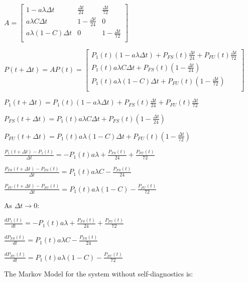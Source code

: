 \documentclass[a4paper,12pt]{article}
\begin{document}
\begin{enumerate}
            $A = \begin{bmatrix}
                1 - a\lambda\Delta t    & \frac{\Delta t}{24}     & \frac{\Delta t}{72}     \\
                a\lambda C\Delta t      & 1 - \frac{\Delta t}{24} & 0                       \\
                a\lambda(1 - C)\Delta t & 0                       & 1 - \frac{\Delta t}{72} \\
            \end{bmatrix}$ 

            $P(t + \Delta t) = AP(t) = \begin{bmatrix}
                P_1(t)(1 - a\lambda\Delta t) + P_{FS}(t)\frac{\Delta t}{24} + P_{FU}(t)\frac{\Delta t}{72} \\
                P_1(t)a\lambda C\Delta t + P_{FS}(t)(1 - \frac{\Delta t}{24}) \\
                P_1(t)a\lambda(1 - C)\Delta t + P_{FU}(t)(1 - \frac{\Delta t}{72}) \\
            \end{bmatrix}$

            $P_1(t + \Delta t) = P_1(t)(1 - a\lambda\Delta t) + P_{FS}(t)\frac{\Delta t}{24} + P_{FU}(t)\frac{\Delta t}{72}$

            $P_{FS}(t + \Delta t) = P_1(t)a\lambda C\Delta t + P_{FS}(t)(1 - \frac{\Delta t}{24})$

            $P_{FU}(t + \Delta t) = P_1(t)a\lambda(1 - C)\Delta t + P_{FU}(t)(1 - \frac{\Delta t}{72})$

            $\frac{P_1(t + \Delta t) - P_1(t)}{\Delta t} = - P_1(t)a\lambda + \frac{P_{FS}(t)}{24} + \frac{P_{FU}(t)}{72}$

            $\frac{P_{FS}(t + \Delta t) - P_{FS}(t)}{\Delta t} = P_1(t)a\lambda C - \frac{P_{FS}(t)}{24}$

            $\frac{P_{FU}(t + \Delta t) - P_{FU}(t)}{\Delta t} = P_1(t)a\lambda(1 - C) - \frac{P_{FU}(t)}{72}$

            As $\Delta t\to 0$:

            $\frac{dP_1(t)}{dt} = - P_1(t)a\lambda + \frac{P_{FS}(t)}{24} + \frac{P_{FU}(t)}{72}$

            $\frac{dP_{FS}(t)}{dt} = P_1(t)a\lambda C - \frac{P_{FS}(t)}{24}$

            $\frac{dP_{FU}(t)}{dt} = P_1(t)a\lambda(1 - C) - \frac{P_{FU}(t)}{72}$

            The Markov Model for the system without self-diagnostics is:


\end{enumerate}
\end{document}
